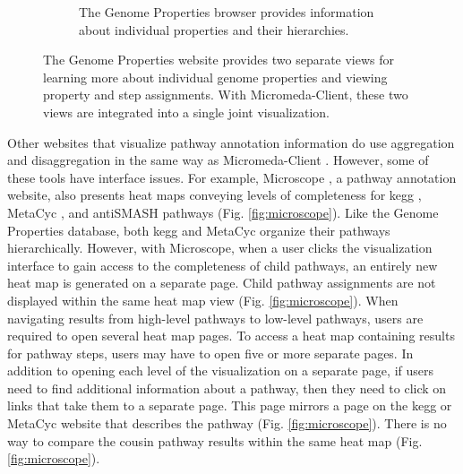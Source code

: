 \begin{figure}
\begin{subfigure}[b]{0.46\textwidth}
         \caption{The Genome Properties browser provides information about individual properties and their hierarchies.}
         \label{fig:property-browser}
     \end{subfigure}
     \caption{The Genome Properties website provides two separate views for learning more about individual genome properties and viewing property and step assignments. With Micromeda-Client, these two views are integrated into a single joint visualization.}
     \label{fig:genome-properties-interface}
\end{figure}

Other websites that visualize pathway annotation information do use aggregation and disaggregation in the same way as Micromeda-Client \cite{vallenet2016microscope,darzi2019functree2}. However, some of these tools have interface issues. For example, Microscope \cite{vallenet2016microscope}, a pathway annotation website, also presents heat maps conveying levels of completeness for \gls{kegg} \cite{kanehisa2000kegg}, MetaCyc \cite{karp2002metacyc}, and antiSMASH \cite{blin2019antismash} pathways (Fig. \ref{fig:microscope}). Like the Genome Properties database, both \gls{kegg} and MetaCyc organize their pathways hierarchically. However, with Microscope, when a user clicks the visualization interface to gain access to the completeness of child pathways, an entirely new heat map is generated on a separate page. Child pathway assignments are not displayed within the same heat map view (Fig. \ref{fig:microscope}). When navigating results from high-level pathways to low-level pathways, users are required to open several heat map pages. To access a heat map containing results for pathway steps, users may have to open five or more separate pages. In addition to opening each level of the visualization on a separate page, if users need to find additional information about a pathway, then they need to click on links that take them to a separate page. This page mirrors a page on the \gls{kegg} or MetaCyc website that describes the pathway (Fig. \ref{fig:microscope}). There is no way to compare the cousin pathway results within the same heat map (Fig. \ref{fig:microscope}).

